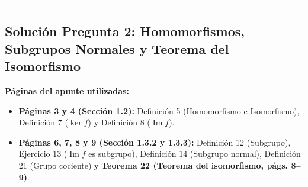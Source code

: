 \documentclass[11pt, a4paper]{article}
\begin{document}
\vspace{4mm}
\hrule
\vspace{4mm}

\subsection*{\textcolor{primary}{Solución Pregunta 2: Homomorfismos, Subgrupos Normales y Teorema del Isomorfismo}}
\textbf{Páginas del apunte utilizadas:}
\begin{itemize}
    \item \textbf{Páginas 3 y 4 (Sección 1.2):} Definición 5 (Homomorfismo e Isomorfismo), Definición 7 ($\ker f$) y Definición 8 ($\operatorname{Im} f$).
    \item \textbf{Páginas 6, 7, 8 y 9 (Sección 1.3.2 y 1.3.3):} Definición 12 (Subgrupo), Ejercicio 13 ($\operatorname{Im} f$ es subgrupo), Definición 14 (Subgrupo normal), Definición 21 (Grupo cociente) y \textbf{Teorema 22 (Teorema del isomorfismo, págs. 8--9)}.
\end{itemize}
\end{document}
